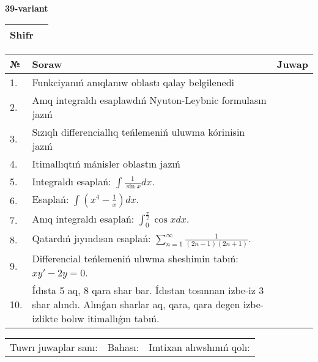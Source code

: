 \documentclass{article}
\begin{document}
  \egroup
  
  \newpage
  
  
  \textbf{39-variant}\\
  
  \bgroup
  \def\arraystretch{1.6} %
  
  \begin{tabular}{|m{5.7cm}|m{9.5cm}|}
  \hline
  Shifr & \\
  \hline
  \end{tabular}
  
  \vspace{1cm}
  
  \begin{tabular}{|m{0.7cm}|m{10cm}|m{4cm}|}
  \hline
  № & Soraw & Juwap \\
  \hline
  1. & Funkciyanıń anıqlanıw oblastı qalay belgilenedi &  \\
  \hline
  2. & Anıq integraldı esaplawdıń Nyuton-Leybnic formulasın jazıń &  \\
  \hline
  3. & Sızıqlı differenciallıq teńlemeniń uluwma kórinisin jazıń &  \\
  \hline
  4. & Itimallıqtıń mánisler oblastın jazıń &  \\
  \hline
  5. & Integraldı esaplań: \(\int{\frac{1}{\sin x}dx}\). &  \\
  \hline
  6. & Esaplań: \(\int\left( x^{4} - \frac{1}{x} \right)dx\). &  \\
  \hline
  7. & Anıq integraldı esaplań: \(\int_{0}^{\frac{\pi}{2}}{\cos xdx}\). &  \\
  \hline
  8. & Qatardıń jıyındısın esaplań: \(\sum_{n = 1}^{\infty}\frac{1}{(2n - 1)(2n + 1)}\). &  \\
  \hline
  9. & Differencial teńlemeniń ulıwma sheshimin tabıń: \(xy' - 2y = 0\). &  \\
  \hline
  10. & Ídısta 5 aq, 8 qara shar bar. Ídıstan tosınnan izbe-iz 3 shar alındı. Alınǵan sharlar aq, qara, qara degen izbe-izlikte bolıw itimallıǵın tabıń. &  \\
  \hline
  \end{tabular}
  
  \vspace{1cm}
  
  \begin{tabular}{lll}
  Tuwrı juwaplar sanı: \underline{\hspace{1.5cm}} & 
  Bahası: \underline{\hspace{1.5cm}} & 
  Imtixan alıwshınıń qolı: \underline{\hspace{2cm}} \\
  \end{tabular}
  
\end{document}
